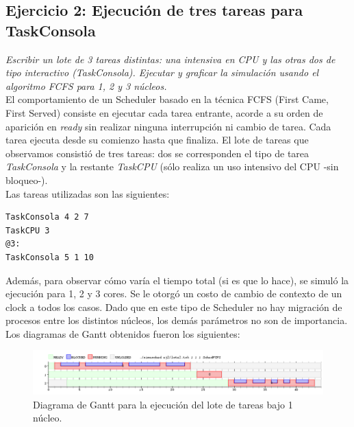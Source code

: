 \documentclass[a4paper]{article}
\begin{document}
\subsection{Ejercicio 2: Ejecuci\'on de tres tareas para TaskConsola}\label{ej2}
\textit{Escribir un lote de 3 tareas distintas: una intensiva en CPU y las otras dos de tipo interactivo (TaskConsola). Ejecutar y graficar la simulaci\'on usando el algoritmo FCFS para 1, 2 y 3 n\'ucleos.}\\

El comportamiento de un Scheduler basado en la t\'ecnica FCFS (First Came, First Served) consiste en ejecutar cada tarea entrante, acorde a su orden de aparici\'on en \textit{ready} sin realizar ninguna interrupci\'on ni cambio de tarea. Cada tarea ejecuta desde su comienzo hasta que finaliza. El lote de tareas que observamos consisti\'o de tres tareas: dos se corresponden el tipo de tarea \textit{TaskConsola} y la restante \textit{TaskCPU} (s\'olo realiza un uso intensivo del CPU -sin bloqueo-). \\

Las tareas utilizadas son las siguientes:


	\begin{codesnippet}
	\begin{verbatim}
TaskConsola 4 2 7
TaskCPU 3
@3:
TaskConsola 5 1 10
	\end{verbatim}
	\end{codesnippet}
	
Además, para observar c\'omo varía el tiempo total (si es que lo hace), se simuló la ejecución para 1, 2 y 3 cores. Se le otorg\'o un costo de cambio de contexto de un clock a todos los casos. Dado que en este tipo de Scheduler no hay migración de procesos entre los distintos núcleos, los dem\'as par\'ametros no son de importancia.\\

Los diagramas de Gantt obtenidos fueron los siguientes:\\

 \begin{figure}[h!]
   \begin{center}
 	\includegraphics[scale=0.5]{imagenes/ej2/1core.png}
 	\caption{Diagrama de Gantt para la ejecuci\'on del lote de tareas bajo 1 n\'ucleo.}
   \end{center}
 \end{figure} 
 
\end{document}
